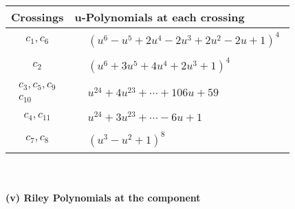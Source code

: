 \documentclass[1p]{elsarticle_modified}
\theoremstyle{definition}
\begin{document}
\begin{tabular}{m{50pt}|m{274pt}}
Crossings & \hspace{64pt}u-Polynomials at each crossing \\
\hline $$\begin{aligned}c_{1},c_{6}\end{aligned}$$&$\begin{aligned}
&(u^6- u^5+2 u^4-2 u^3+2 u^2-2 u+1)^4
\end{aligned}$\\
\hline $$\begin{aligned}c_{2}\end{aligned}$$&$\begin{aligned}
&(u^6+3 u^5+4 u^4+2 u^3+1)^4
\end{aligned}$\\
\hline $$\begin{aligned}c_{3},c_{5},c_{9}\\c_{10}\end{aligned}$$&$\begin{aligned}
&u^{24}+4 u^{23}+\cdots+106 u+59
\end{aligned}$\\
\hline $$\begin{aligned}c_{4},c_{11}\end{aligned}$$&$\begin{aligned}
&u^{24}+3 u^{23}+\cdots-6 u+1
\end{aligned}$\\
\hline $$\begin{aligned}c_{7},c_{8}\end{aligned}$$&$\begin{aligned}
&(u^3- u^2+1)^8
\end{aligned}$\\
\hline
\end{tabular}\\~\\
\newpage\renewcommand{\arraystretch}{1}
\flushleft \textbf{(v) Riley Polynomials at the component}\newline \\
\end{document}
